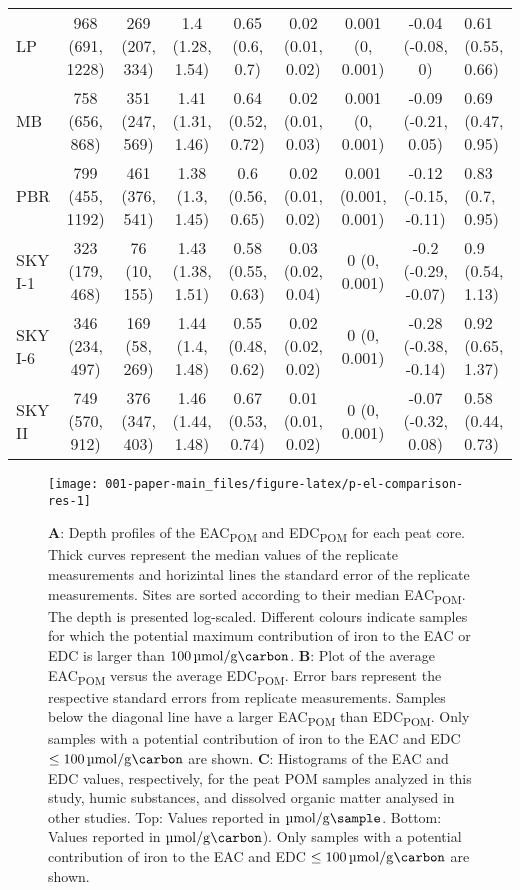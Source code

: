 \documentclass[draft,linenumbers]{agujournal2018}
\begin{document}
\begin{landscape}
\begin{table}
{\begin{tabular}[t]{lcccccccl}
LP & 968 (691, 1228) & 269 (207, 334) & 1.4 (1.28, 1.54) & 0.65 (0.6, 0.7) & 0.02 (0.01, 0.02) & 0.001 (0, 0.001) & -0.04 (-0.08, 0) & 0.61 (0.55, 0.66)\\
\addlinespace
MB & 758 (656, 868) & 351 (247, 569) & 1.41 (1.31, 1.46) & 0.64 (0.52, 0.72) & 0.02 (0.01, 0.03) & 0.001 (0, 0.001) & -0.09 (-0.21, 0.05) & 0.69 (0.47, 0.95)\\
PBR & 799 (455, 1192) & 461 (376, 541) & 1.38 (1.3, 1.45) & 0.6 (0.56, 0.65) & 0.02 (0.01, 0.02) & 0.001 (0.001, 0.001) & -0.12 (-0.15, -0.11) & 0.83 (0.7, 0.95)\\
SKY I-1 & 323 (179, 468) & 76 (10, 155) & 1.43 (1.38, 1.51) & 0.58 (0.55, 0.63) & 0.03 (0.02, 0.04) & 0 (0, 0.001) & -0.2 (-0.29, -0.07) & 0.9 (0.54, 1.13)\\
SKY I-6 & 346 (234, 497) & 169 (58, 269) & 1.44 (1.4, 1.48) & 0.55 (0.48, 0.62) & 0.02 (0.02, 0.02) & 0 (0, 0.001) & -0.28 (-0.38, -0.14) & 0.92 (0.65, 1.37)\\
SKY II & 749 (570, 912) & 376 (347, 403) & 1.46 (1.44, 1.48) & 0.67 (0.53, 0.74) & 0.01 (0.01, 0.02) & 0 (0, 0.001) & -0.07 (-0.32, 0.08) & 0.58 (0.44, 0.73)\\
\bottomrule
\end{tabular}}
\end{table}
\end{landscape}

\begin{figure}[H]

{\centering \texttt{[image: 001-paper-main\_files/figure-latex/p-el-comparison-res-1]} 

}

\caption{\textbf{A}: Depth profiles of the EAC\textsubscript{POM} and EDC\textsubscript{POM} for each peat core. Thick curves represent the median values of the replicate measurements and horizintal lines the standard error of the replicate measurements. Sites are sorted according to their median EAC\textsubscript{POM}. The depth is presented log-scaled. Different colours indicate samples for which the potential maximum contribution of iron to the EAC or EDC is larger than $\SI{100}{\micro\mol\per\gram\carbon}$. \textbf{B}: Plot of the average EAC\textsubscript{POM} versus the average EDC\textsubscript{POM}. Error bars represent the respective standard errors from replicate measurements. Samples below the diagonal line have a larger EAC\textsubscript{POM} than EDC\textsubscript{POM}. Only samples with a potential contribution of iron to the EAC and EDC $\le\SI{100}{\micro\mol\per\gram\carbon}$ are shown. \textbf{C}: Histograms of the EAC and EDC values, respectively, for the peat POM samples analyzed in this study, humic substances, and dissolved organic matter analysed in other studies. Top: Values reported in $\si{\micro\mol\per\g\sample}$. Bottom: Values reported in $\si{\micro\mol\per\g\carbon}$). Only samples with a potential contribution of iron to the EAC and EDC $\le\SI{100}{\micro\mol\per\gram\carbon}$ are shown.}\label{fig:p-el-comparison-res}
\end{figure}
\end{document}
